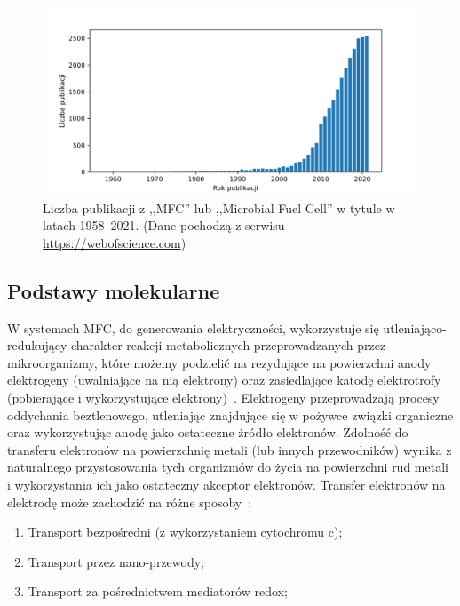 \documentclass[12pt, a4paper]{article}
\begin{document}
\begin{figure}[!b]
    \centering
    \includegraphics[width=\textwidth]{figures/publications}
    \caption{
        Liczba publikacji z ,,MFC'' lub
        ,,Microbial Fuel Cell'' w tytule w latach 1958--2021.
        (Dane pochodzą z serwisu \url{https://webofscience.com})
    }
    \label{fig:1}
\end{figure}

\subsection{Podstawy molekularne}\label{subsec:podstawy-molekularne}
W systemach MFC, do generowania elektryczności, wykorzystuje się
utleniająco-redukujący charakter reakcji metabolicznych
przeprowadzanych przez mikroorganizmy, które możemy podzielić
na rezydujące na powierzchni anody elektrogeny (uwalniające na nią
elektrony) oraz zasiedlające katodę elektrotrofy
(pobierające i wykorzystujące elektrony)~\cite{AlSayed2020}.
Elektrogeny przeprowadzają procesy oddychania beztlenowego,
utleniając znajdujące się w pożywce związki organiczne oraz
wykorzystując anodę jako ostateczne źródło elektronów.
Zdolność do transferu elektronów na powierzchnię metali (lub
innych przewodników) wynika z naturalnego przystosowania tych
organizmów do życia na powierzchni rud metali i wykorzystania
ich jako ostateczny akceptor elektronów.
Transfer elektronów na elektrodę może zachodzić na różne
sposoby~\cite{Santoro2017}:

\begin{enumerate}
    \item Transport bezpośredni (z wykorzystaniem cytochromu c);
    \item Transport przez nano-przewody;
    \item Transport za pośrednictwem mediatorów redox;
\end{enumerate}
\end{document}
